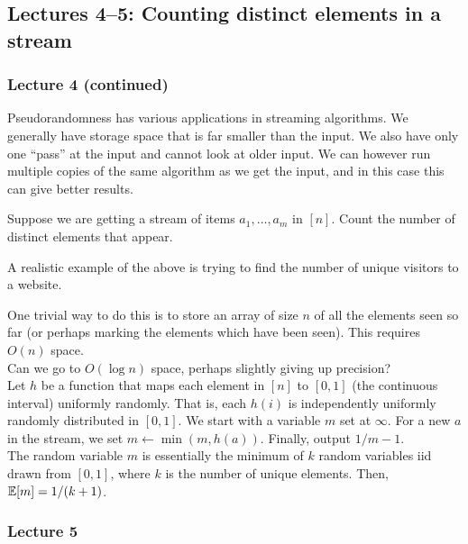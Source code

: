 	\subsection{Lectures 4--5: Counting distinct elements in a stream}

		\subsubsection{Lecture 4 (continued)}

			Pseudorandomness has various applications in streaming algorithms. We generally have storage space that is far smaller than the input. We also have only one ``pass'' at the input and cannot look at older input. We can however run multiple copies of the same algorithm as we get the input, and in this case this can give better results.

			\begin{problem*}
				Suppose we are getting a stream of items $a_1,\ldots,a_m$ in $[n]$. Count the number of distinct elements that appear.
			\end{problem*}
			A realistic example of the above is trying to find the number of unique visitors to a website.

			One trivial way to do this is to store an array of size $n$ of all the elements seen so far (or perhaps marking the elements which have been seen). This requires $O(n)$ space.\\
			Can we go to $O(\log n)$ space, perhaps slightly giving up precision?\\

			Let $h$ be a function that maps each element in $[n]$ to $[0,1]$ (the continuous interval) uniformly randomly. That is, each $h(i)$ is independently uniformly randomly distributed in $[0,1]$. We start with a variable $m$ set at $\infty$. For a new $a$ in the stream, we set $m \gets \min(m,h(a))$. Finally, output $1/m - 1$.\\
			The random variable $m$ is essentially the minimum of $k$ random variables iid drawn from $[0,1]$, where $k$ is the number of unique elements. Then, $\mathbb{E}[m] = 1/(k+1)$.


		\subsubsection{Lecture 5}

